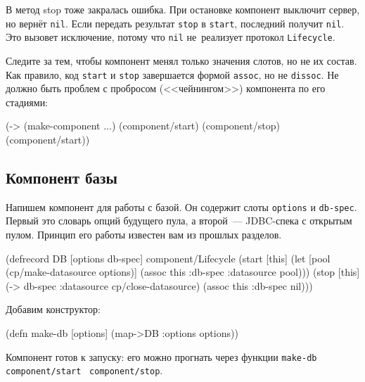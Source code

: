 В метод stop тоже закралась ошибка. При остановке компонент выключит сервер, но
вернёт \verb|nil|. Если передать результат \verb|stop| в \verb|start|,
последний получит \verb|nil|. Это вызовет исключение, потому что \verb|nil|
не~реализует протокол \verb|Lifecycle|.


Следите за тем, чтобы компонент менял только значения слотов, но не их
состав. Как правило, код \verb|start| и \verb|stop| завершается формой
\verb|assoc|, но не \verb|dissoc|. Не должно быть проблем с пробросом
(<<чейнингом>>) компонента по его стадиями:

\begin{english}
  \begin{clojure}
(-> (make-component {...})
    (component/start)
    (component/stop)
    (component/start))
  \end{clojure}
\end{english}


\subsection{Компонент базы}

Напишем компонент для работы с базой. Он содержит слоты \verb|options| и
\verb|db-spec|. Первый это словарь опций будущего пула, а второй~--- JDBC-спека
с открытым пулом. Принцип его работы известен вам из прошлых разделов.

\begin{english}
  \begin{clojure}
(defrecord DB [options db-spec]
  component/Lifecycle
  (start [this]
    (let [pool (cp/make-datasource options)]
      (assoc this :db-spec {:datasource pool})))
  (stop [this]
    (-> db-spec :datasource cp/close-datasource)
    (assoc this :db-spec nil)))
  \end{clojure}
\end{english}

\noindent
Добавим конструктор:

\begin{english}
  \begin{clojure}
(defn make-db [options]
  (map->DB {:options options}))
  \end{clojure}
\end{english}

Компонент готов к запуску: его можно прогнать через функции
\verb|make-db|~\arr{} \verb|component/start|~\arr{} \verb|component/stop|.

